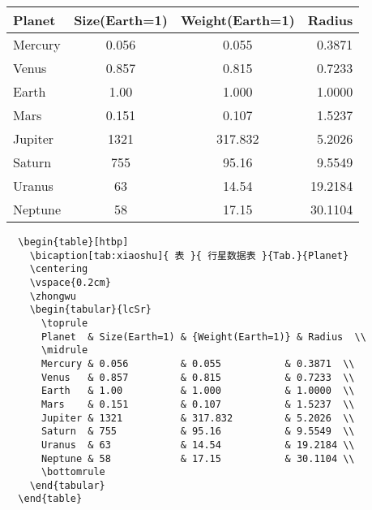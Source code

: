 \begin{table}[htbp]
  \centering
  \vspace{0.2cm}
  \zhongwu
  \begin{tabular}{lcSr}
    \toprule
    Planet  & Size(Earth=1) & {Weight(Earth=1)} & Radius  \\
    \midrule
    Mercury & 0.056         & 0.055           & 0.3871  \\
    Venus   & 0.857         & 0.815           & 0.7233  \\ 
    Earth   & 1.00          & 1.000           & 1.0000  \\ 
    Mars    & 0.151         & 0.107           & 1.5237  \\ 
    Jupiter & 1321          & 317.832         & 5.2026  \\ 
    Saturn  & 755           & 95.16           & 9.5549  \\ 
    Uranus  & 63            & 14.54           & 19.2184 \\ 
    Neptune & 58            & 17.15           & 30.1104 \\ 
    \bottomrule
  \end{tabular}
\end{table}

\begin{lstlisting}
  \begin{table}[htbp]
    \bicaption[tab:xiaoshu]{ 表 }{ 行星数据表 }{Tab.}{Planet}
    \centering
    \vspace{0.2cm}
    \zhongwu
    \begin{tabular}{lcSr}
      \toprule
      Planet  & Size(Earth=1) & {Weight(Earth=1)} & Radius  \\
      \midrule
      Mercury & 0.056         & 0.055           & 0.3871  \\
      Venus   & 0.857         & 0.815           & 0.7233  \\ 
      Earth   & 1.00          & 1.000           & 1.0000  \\ 
      Mars    & 0.151         & 0.107           & 1.5237  \\ 
      Jupiter & 1321          & 317.832         & 5.2026  \\ 
      Saturn  & 755           & 95.16           & 9.5549  \\ 
      Uranus  & 63            & 14.54           & 19.2184 \\ 
      Neptune & 58            & 17.15           & 30.1104 \\ 
      \bottomrule
    \end{tabular}
  \end{table}
\end{lstlisting}

